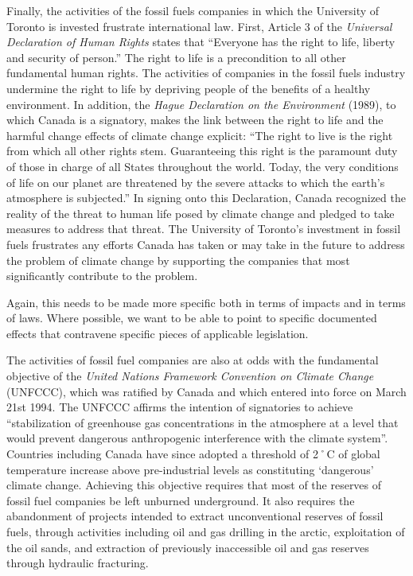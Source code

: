 Finally, the activities of the fossil fuels companies in which the University of Toronto is invested frustrate international law.  
First, Article 3 of the \emph{Universal Declaration of Human Rights} states that ``Everyone has the right to life, liberty and security of person.''   
The right to life is a precondition to all other fundamental human rights.  
The activities of companies in the fossil fuels industry undermine the right to life by depriving people of the benefits of a healthy environment.  
In addition, the \emph{Hague Declaration on the Environment} (1989), to which Canada is a signatory, makes the link between the right to life and the harmful change effects of climate change explicit: ``The right to live is the right from which all other rights stem.  
Guaranteeing this right is the paramount duty of those in charge of all States throughout the world.  
Today, the very conditions of life on our planet are threatened by the severe attacks to which the earth’s atmosphere is subjected.''   
In signing onto this Declaration, Canada recognized the reality of the threat to human life posed by climate change and pledged to take measures to address that threat.  
The University of Toronto’s investment in fossil fuels frustrates any efforts Canada has taken or may take in the future to address the problem of climate change by supporting the companies that most significantly contribute to the problem.	

\begin{vcom}
	Again, this needs to be made more specific both in terms of impacts and in terms of laws. Where possible, we want to be able to point to specific documented effects that contravene specific pieces of applicable legislation.
\end{vcom}


The activities of fossil fuel companies are also at odds with the fundamental objective of the \emph{United Nations Framework Convention on Climate Change} (UNFCCC), which was ratified by Canada and which entered into force on March 21st 1994.
The UNFCCC affirms the intention of signatories to achieve ``stabilization of greenhouse gas concentrations in the atmosphere at a level that would prevent dangerous anthropogenic interference with the climate system''.
Countries including Canada have since adopted a threshold of 2˚C of global temperature increase above pre-industrial levels as constituting `dangerous' climate change.
Achieving this objective requires that most of the reserves of fossil fuel companies be left unburned underground.
It also requires the abandonment of projects intended to extract unconventional reserves of fossil fuels, through activities including oil and gas drilling in the arctic, exploitation of the oil sands, and extraction of previously inaccessible oil and gas reserves through hydraulic fracturing.



